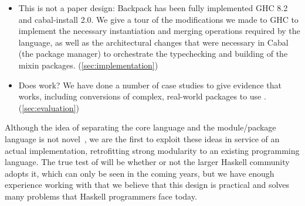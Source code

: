 \begin{itemize}
    \item This is not a paper design: Backpack has been fully
    implemented GHC 8.2 and cabal-install 2.0.
    We give a tour of the modifications we made to GHC to
    implement the necessary instantiation and merging operations
    required by the \unit{} language, as well as the architectural
    changes that were necessary in Cabal (the package manager)
    to orchestrate the typechecking and building of the mixin
    packages. (\cref{sec:implementation})

    \item Does \Backpack{} work?
    We have done a number of case studies to give evidence
    that \Backpack{} works, including conversions of complex,
    real-world packages to use \Backpack{}. (\cref{sec:evaluation})


\end{itemize}
%
Although the idea of separating the core language and the module/package
language is not novel~\cite{leroy:modular,milner+:def-of-sml-revised,rossberg+:f-ing}, we are the first to exploit these ideas in service
of an actual implementation, retrofitting strong modularity to an existing
programming language.  The true test of \Backpack{} will be whether or not
the larger Haskell community adopts it, which can only be seen in the
coming years, but we have enough experience working with \Backpack{}
that we believe that this design is practical and solves many problems
that Haskell programmers face today.




